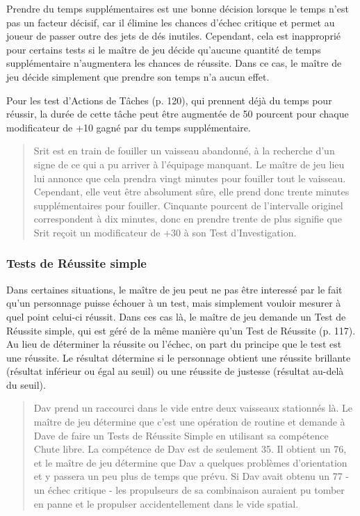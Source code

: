 Prendre du temps supplémentaires est une bonne décision lorsque le temps n'est pas un facteur décisif, car il élimine les chances d'échec critique et permet au joueur de passer outre des jets de dés inutiles. Cependant, cela est inapproprié pour certains tests si le maître de jeu décide qu'aucune quantité de temps supplémentaire n'augmentera les chances de réussite. Dans ce cas, le maître de jeu décide simplement que prendre son temps n'a aucun effet. 

Pour les test d'Actions de Tâches (p. 120), qui prennent déjà du temps pour réussir, la durée de cette tâche peut être augmentée de 50 pourcent pour chaque modificateur de +10 gagné par du temps supplémentaire. 

\begin{quotation} Srit est en train de fouiller un vaisseau abandonné, à la recherche d'un signe de ce qui a pu arriver à l'équipage manquant. Le maître de jeu lieu lui annonce que cela prendra vingt minutes pour fouiller tout le vaisseau. Cependant, elle veut être absolument sûre, elle prend donc trente minutes supplémentaires pour fouiller. Cinquante pourcent de l'intervalle originel correspondent à dix minutes, donc en prendre trente de plus signifie que Srit reçoit un modificateur de +30 à son Test d'Investigation. \end{quotation} 

\subsubsection{Tests de Réussite simple} \label{sec:simple-success-tests} 

Dans certaines situations, le maître de jeu peut ne pas être interessé par le fait qu'un personnage puisse échouer à un test, mais simplement vouloir mesurer à quel point celui-ci réussit. Dans ces cas là, le maître de jeu demande un Test de Réussite simple, qui est géré de la même manière qu'un Test de Réussite (p. 117). Au lieu de déterminer la réussite ou l'échec, on part du principe que le test est une réussite. Le résultat détermine si le personnage obtient une réussite brillante (résultat inférieur ou égal au seuil) ou une réussite de justesse (résultat au-delà du seuil). 

\begin{quotation} Dav prend un raccourci dans le vide entre deux vaisseaux stationnés là. Le maître de jeu détermine que c'est une opération de routine et demande à Dave de faire un Tests de Réussite Simple en utilisant sa compétence Chute libre. La compétence de Dav est de seulement 35. Il obtient un 76, et le maître de jeu détermine que Dav a quelques problèmes d'orientation et y passera un peu plus de temps que prévu. Si Dav avait obtenu un 77 - un échec critique - les propulseurs de sa combinaison auraient pu tomber en panne et le propulser accidentellement dans le vide spatial. \end{quotation} 

